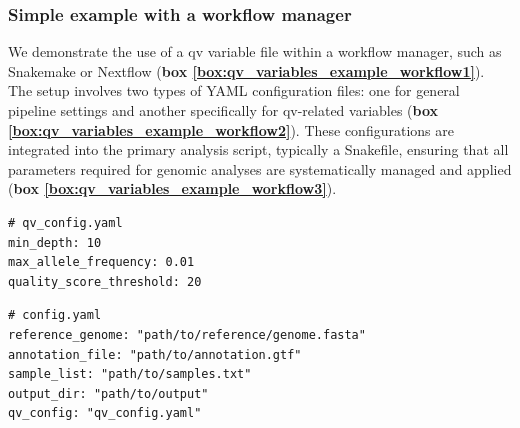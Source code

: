 \subsubsection{Simple example with a workflow manager}
We demonstrate the use of a \ac{qv} variable file within a workflow manager, such as Snakemake or Nextflow
(\textbf{box \ref{box:qv_variables_example_workflow1}}).
The setup involves two types of YAML configuration files: one for general pipeline settings and another specifically for \ac{qv}-related variables
(\textbf{box \ref{box:qv_variables_example_workflow2}}).
These configurations are integrated into the primary analysis script, typically a Snakefile, ensuring that all parameters required for genomic analyses are systematically managed and applied 
(\textbf{box \ref{box:qv_variables_example_workflow3}}). 

\begin{tcolorbox}[
    breakable,  %
    colback=white!0,  %
    colframe=black,  %
    boxrule=1pt,  %
    arc=1mm,  %
    outer arc=1mm,
     title=\textbf{\refstepcounter{myboxcounter}\label{box:qv_variables_example_workflow1}Box \themyboxcounter: Example worflow manager - yaml}
]

\begin{verbatim}
# qv_config.yaml
min_depth: 10
max_allele_frequency: 0.01
quality_score_threshold: 20
\end{verbatim}
\end{tcolorbox}

\begin{tcolorbox}[
    breakable,  %
    colback=white!0,  %
    colframe=black,  %
    boxrule=1pt,  %
    arc=1mm,  %
    outer arc=1mm,
     title=\textbf{\refstepcounter{myboxcounter}\label{box:qv_variables_example_workflow2}Box \themyboxcounter: Example worflow manager - yaml}
]
\begin{verbatim}
# config.yaml
reference_genome: "path/to/reference/genome.fasta"
annotation_file: "path/to/annotation.gtf"
sample_list: "path/to/samples.txt"
output_dir: "path/to/output"
qv_config: "qv_config.yaml"
\end{verbatim}
\end{tcolorbox}



